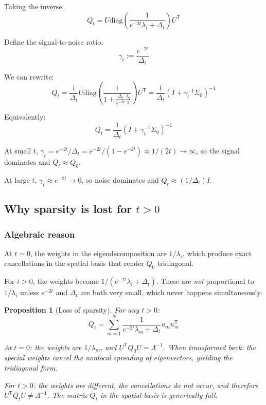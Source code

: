 \documentclass[11pt,a4paper]{article}
\theoremstyle{plain}
\newtheorem{proposition}[theorem]{Proposition}
\theoremstyle{definition}
\newcommand{\Sig}{\Sigma}
\newcommand{\Prec}{Q}
\newcommand{\delt}{\Delta_t}
\newcommand{\tr}{\mathsf{T}}
\begin{document}
Taking the inverse:
\begin{equation}
\Prec_t = U \text{diag}\left(\frac{1}{e^{-2t}\lambda_i + \delt}\right) U^\tr
\end{equation}

Define the signal-to-noise ratio:
\begin{equation}
\gamma_t := \frac{e^{-2t}}{\delt}
\end{equation}

We can rewrite:
\begin{equation}
\Prec_t = \frac{1}{\delt} U \text{diag}\left(\frac{1}{1 + \frac{\delt}{e^{-2t}}\frac{\lambda_i}{1}}\right) U^\tr = \frac{1}{\delt}(I + \gamma_t^{-1}\Sig_0)^{-1}
\end{equation}

Equivalently:
\begin{equation}
\Prec_t = \frac{1}{\delt}(I + \gamma_t^{-1}\Sig_0)^{-1}
\end{equation}

At small $t$, $\gamma_t = e^{-2t}/\delt = e^{-2t}/(1-e^{-2t}) \approx 1/(2t) \to \infty$, so the signal dominates and $\Prec_t \approx \Prec_0$.

At large $t$, $\gamma_t \approx e^{-2t} \to 0$, so noise dominates and $\Prec_t \approx (1/\delt)I$.

\subsection{Why sparsity is lost for $t > 0$}
\label{sec:sparsity-lost}

\subsubsection{Algebraic reason}

At $t=0$, the weights in the eigendecomposition are $1/\lambda_i$, which produce exact cancellations in the spatial basis that render $\Prec_0$ tridiagonal.

For $t > 0$, the weights become $1/(e^{-2t}\lambda_i + \delt)$. These are \emph{not} proportional to $1/\lambda_i$ unless $e^{-2t}$ and $\delt$ are both very small, which never happens simultaneously.

\begin{proposition}[Loss of sparsity]
For any $t > 0$:
\begin{equation}
\Prec_t = \sum_{m=1}^N \frac{1}{e^{-2t}\lambda_m + \delt} u_m u_m^\tr
\end{equation}

At $t=0$: the weights are $1/\lambda_m$, and $U^\tr \Prec_0 U = \Lambda^{-1}$. When transformed back: the special weights cancel the nonlocal spreading of eigenvectors, yielding the tridiagonal form.

For $t > 0$: the weights are different, the cancellations do not occur, and therefore $U^\tr \Prec_t U \ne \Lambda^{-1}$. The matrix $\Prec_t$ in the spatial basis is generically full.
\end{proposition}
\end{document}
